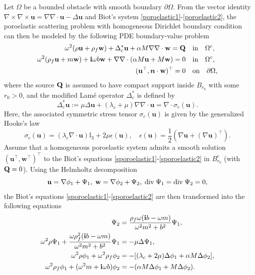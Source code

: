 \documentclass[11pt]{article}
\newcommand{\mat}{\mathbb}
\newcommand{\pa}{\partial}
\newcommand{\dive}{{\rm div}}
\newcommand{\Om}{\Omega}
\newcommand{\sig}{\sigma}
\newcommand{\na}{\nabla}
\newcommand{\la}{\lambda}
\newcommand{\De}{\Delta}
\newcommand{\bs}{\boldsymbol}
\begin{document}
Let $\Om$ be a bounded obstacle with smooth boundary $\pa \Om$. From the vector identity $\nabla \times 
\nabla \times \mathbf{u}=\nabla \nabla \cdot \mathbf{u}-\Delta\mathbf{u}$ and Biot's system 
\eqref{poroelastic1}-\eqref{poroelastic2}, the poroelastic scattering problem with homogeneous Dirichlet 
boundary condition can then be modeled by the following PDE boundary-value problem 
\begin{subequations}
\begin{align}\label{sporoelastic1}
\omega^2(\rho\mathbf{u} +\rho_f \mathbf{w})+\Delta_c^*\mathbf{u}+\alpha M \nabla \nabla \cdot 
\mathbf{w}={\bf Q} \quad &{\rm in} \quad \Om^c,\\\label{sporoelastic2}
\omega^2(\rho_f \mathbf{u}+m \mathbf{w})+{\bf{i}}\omega b \mathbf{w}+\nabla \nabla \cdot 
(\alpha M \mathbf{u}+ M \mathbf{w})=0\quad &{\rm in} \quad \Om^c,\\\label{sDBC2}
(\mathbf{u}^{\top},\bs{n}\cdot \mathbf{w})^{\top}=0 \quad&{\rm on}\quad \pa \Om,
\end{align}
\end{subequations}
where the source ${\bf Q}$ is assumed to have compact support inside $B_{r_0}$ with some $r_0>0$, and
the modified Lam\'{e} operator $\De_c^*$ is defined by
\begin{equation*}
\De_c^*\mathbf{u}:=\mu \De \mathbf{u}+(\la_c +\mu)\na \na \cdot \mathbf{u} =\na \cdot \sig_c(\mathbf{u}).
\end{equation*}
Here, the associated symmetric stress tensor $\sig_c(\mathbf{u})$ is given by the generalized Hooke's law
\begin{equation*}
\sig_c(\mathbf{u})=(\la_c \na \cdot \mathbf{u} )\mat{I}_3+2\mu \epsilon(\mathbf{u}), \quad 
\epsilon(\mathbf{u})=\frac{1}{2}(\na \mathbf{u}+(\na \mathbf{u})^{\top}).
\end{equation*}
Assume that a homogeneous poroelastic system admits a smooth solution $(\mathbf{u}^{\top},\mathbf{w}^{\top})^{\top}$ 
to the Biot's equations \eqref{sporoelastic1}-\eqref{sporoelastic2} in $B_{r_0}^c$ (with ${\bf Q}=0$). 
Using the Helmholtz decomposition
\begin{equation*}
\mathbf{u}=\nabla \phi_1 +\Psi_1,\;\mathbf{w}=\nabla \phi_2 +\Psi_2,\; \dive\;{\Psi_1}=\dive\;{\Psi_2}=0,
\end{equation*}
the Biot's equations  \eqref{sporoelastic1}-\eqref{sporoelastic2} are then transformed into the following equations
\begin{subequations}
\begin{align}
\Psi_2 &=\frac{\rho_f\omega({\bf{i}}b-\omega m)}{\omega^2m^2+b^2}\Psi_1,\label{HeD1} \\
\omega^2\rho\Psi_1+\frac{\omega\rho_f^2({\bf{i}}b-\omega m)}{\omega^2m^2+b^2}\Psi_1&=-\mu\Delta\Psi_1,	\label{HeD2}\\
\omega^2\rho\phi_1+\omega^2\rho_f\phi_2&=-[(\la_c+2\mu)\Delta\phi_1+\alpha M \Delta\phi_2],	\label{HeD3}\\
\omega^2\rho_f\phi_1+(\omega^2m+{\bf{i}}\omega b)\phi_2&=-(\alpha M \Delta\phi_1+ M \Delta\phi_2).	\label{HeD4}
\end{align}
\end{subequations}
\end{document}
